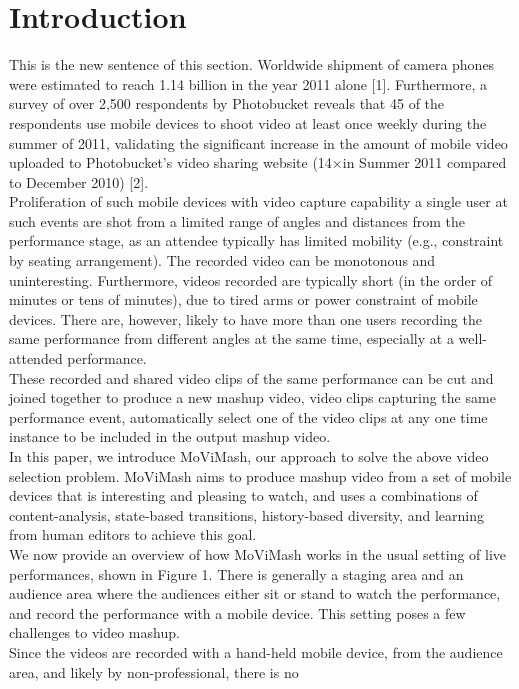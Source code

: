 \documentclass{sig-alternate}
\begin{document}
{{{\section{Introduction}
This is the new sentence of this section.
Worldwide shipment of camera phones were estimated to reach
1.14 billion in the year 2011 alone [1]. Furthermore, a survey of
over 2,500 respondents by Photobucket reveals that 45  of the respondents
use mobile devices to shoot video at least once weekly during the summer of 2011, validating the significant increase in
the amount of mobile video uploaded to Photobucket’s video sharing
website (14×in Summer 2011 compared to December 2010) [2].\\
Proliferation of such mobile devices with video capture capability
a single user at such events are shot from a limited range of angles
and distances from the performance stage, as an attendee typically
has limited mobility (e.g., constraint by seating arrangement).
The recorded video can be monotonous and uninteresting. Furthermore,
videos recorded are typically short (in the order of minutes
or tens of minutes), due to tired arms or power constraint of mobile
devices. There are, however, likely to have more than one users
recording the same performance from different angles at the same
time, especially at a well-attended performance.\\
These recorded and shared video clips of the same performance
can be cut and joined together to produce a new mashup video,
video clips capturing the same performance event, automatically
select one of the video clips at any one time instance to be included
in the output mashup video.\\
In this paper, we introduce MoViMash, our approach to solve
the above video selection problem. MoViMash aims to produce
mashup video from a set of mobile devices that is interesting and
pleasing to watch, and uses a combinations of content-analysis,
state-based transitions, history-based diversity, and learning from
human editors to achieve this goal.\\
We now provide an overview of how MoViMash works in the
usual setting of live performances, shown in Figure 1. There is
generally a staging area and an audience area where the audiences
either sit or stand to watch the performance, and record the performance
with a mobile device. This setting poses a few challenges to
video mashup.\\
Since the videos are recorded with a hand-held mobile device,
from the audience area, and likely by non-professional, there is no
}}}
\end{document}
